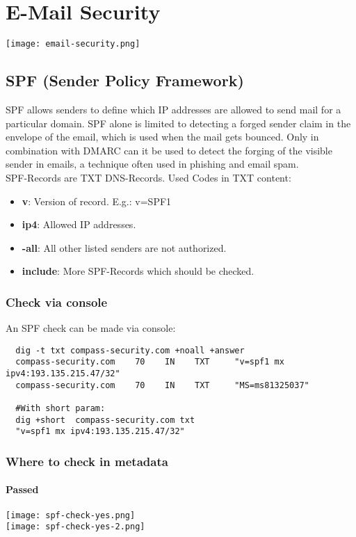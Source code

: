 \section{E-Mail Security}
\texttt{[image: email-security.png]}

\subsection{SPF (Sender Policy Framework)}
SPF allows senders to define which IP addresses are allowed to send mail for a particular domain. SPF alone is limited to detecting a forged sender claim in the envelope of the email, which is used when the mail gets bounced.
Only in combination with DMARC can it be used to detect the forging of the visible sender in emails, a technique often used in phishing and email spam.\\

SPF-Records are TXT DNS-Records. Used Codes in TXT content:
\begin{itemize}
  \item \textbf{v}: Version of record. E.g.: v=SPF1
  \item \textbf{ip4}: Allowed IP addresses.
  \item \textbf{-all}: All other listed senders are not authorized.
  \item \textbf{include}: More SPF-Records which should be checked.
\end{itemize}

\subsubsection{Check via console}
An SPF check can be made via console:
\begin{lstlisting}
  dig -t txt compass-security.com +noall +answer
  compass-security.com    70    IN    TXT     "v=spf1 mx ipv4:193.135.215.47/32"
  compass-security.com    70    IN    TXT     "MS=ms81325037"

  #With short param:
  dig +short  compass-security.com txt
  "v=spf1 mx ipv4:193.135.215.47/32"
\end{lstlisting}

\subsubsection{Where to check in metadata}
\paragraph{Passed}
\texttt{[image: spf-check-yes.png]}\\
\texttt{[image: spf-check-yes-2.png]}


